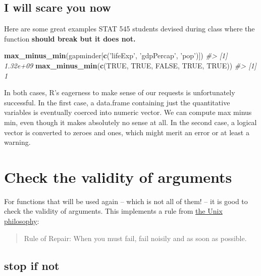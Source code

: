 \documentclass[
]{book}
\newenvironment{Shaded}{\begin{snugshade}}{\end{snugshade}}
\newcommand{\CommentTok}[1]{\textcolor[rgb]{0.56,0.35,0.01}{\textit{#1}}}
\newcommand{\KeywordTok}[1]{\textcolor[rgb]{0.13,0.29,0.53}{\textbf{#1}}}
\newcommand{\NormalTok}[1]{#1}
\newcommand{\OtherTok}[1]{\textcolor[rgb]{0.56,0.35,0.01}{#1}}
\newcommand{\StringTok}[1]{\textcolor[rgb]{0.31,0.60,0.02}{#1}}
\begin{document}
\hypertarget{i-will-scare-you-now}{%
\subsection{I will scare you now}\label{i-will-scare-you-now}}

Here are some great examples STAT 545 students devised during class where the function \textbf{should break but it does not.}

\begin{Shaded}
\begin{Highlighting}[]
\KeywordTok{max_minus_min}\NormalTok{(gapminder[}\KeywordTok{c}\NormalTok{(}\StringTok{'lifeExp'}\NormalTok{, }\StringTok{'gdpPercap'}\NormalTok{, }\StringTok{'pop'}\NormalTok{)])}
\CommentTok{#> [1] 1.32e+09}
\KeywordTok{max_minus_min}\NormalTok{(}\KeywordTok{c}\NormalTok{(}\OtherTok{TRUE}\NormalTok{, }\OtherTok{TRUE}\NormalTok{, }\OtherTok{FALSE}\NormalTok{, }\OtherTok{TRUE}\NormalTok{, }\OtherTok{TRUE}\NormalTok{))}
\CommentTok{#> [1] 1}
\end{Highlighting}
\end{Shaded}

In both cases, R's eagerness to make sense of our requests is unfortunately successful. In the first case, a data.frame containing just the quantitative variables is eventually coerced into numeric vector. We can compute max minus min, even though it makes absolutely no sense at all. In the second case, a logical vector is converted to zeroes and ones, which might merit an error or at least a warning.

\hypertarget{check-the-validity-of-arguments}{%
\section{Check the validity of arguments}\label{check-the-validity-of-arguments}}

For functions that will be used again -- which is not all of them! -- it is good to check the validity of arguments. This implements a rule from \href{http://www.faqs.org/docs/artu/ch01s06.html}{the Unix philosophy}:

\begin{quote}
Rule of Repair: When you must fail, fail noisily and as soon as possible.
\end{quote}

\hypertarget{stop-if-not}{%
\subsection{stop if not}\label{stop-if-not}}
\end{document}
